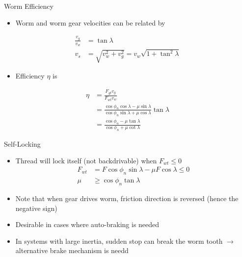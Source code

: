 \documentclass[10pt, svgnames]{beamer}
\begin{document}
\begin{frame}[label={sec:org66c4dc4}]{Worm Efficiency}
\begin{itemize}
\item Worm and worm gear velocities can be related by
\end{itemize}

\begin{align*}
    \frac{v_{g}}{v_{w}} &= \tan \lambda \\
    v_{s} &= \sqrt{v_{w}^{2} + v_{g}^{2}} = v_{w} \sqrt{1 + \tan^{2} \lambda}
\end{align*}

\begin{itemize}
\item Efficiency \(\eta\) is
\end{itemize}

\begin{align*}
    \eta &= \frac{F_{gt}v_{g}}{F_{wt}v_{w}} \\
         &= \frac{\cos \phi_{n} \cos \lambda - \mu \sin \lambda}{\cos \phi_{n} \sin \lambda + \mu \cos \lambda} \tan \lambda \\
         &= \frac{\cos \phi_{n} - \mu \tan \lambda}{\cos \phi_{n} + \mu \cot \lambda}
\end{align*}
\end{frame}

\begin{frame}[label={sec:org6955115}]{Self-Locking}
\begin{itemize}
\item Thread will lock itself (not backdrivable) when \(F_{wt} \leqslant 0\)
\begin{align*}
  F_{wt} &= F \cos \phi_{n} \sin \lambda - \mu F \cos \lambda \leqslant 0 \\
  \mu &\geqslant \cos \phi_{n} \tan \lambda
\end{align*}

\item Note that when gear drives worm, friction direction is reversed (hence
the negative sign)

\item Desirable in cases where auto-braking is needed

\item In systems with large inertia, sudden stop can break the worm tooth \(\rightarrow\) alternative brake mechanism is needd
\end{itemize}
\end{frame}
\end{document}
